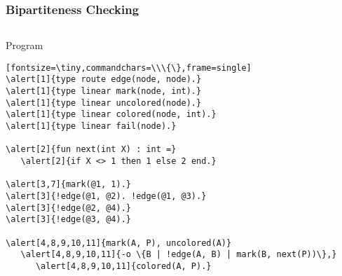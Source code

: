 \documentclass{beamer}
\let\oldalert\alert
\renewcommand{\alert}[2][]{%
  \if\relax\detokenize{#1}\relax%
    \oldalert{#2}%
  \else
    \oldalert<#1>{#2}%
  \fi}
\begin{document}
\begin{frame}[fragile]
  \frametitle{Bipartiteness Checking}
  \begin{columns}[t]
     \begin{block}{Program}
       \begin{verbatim}[fontsize=\tiny,commandchars=\\\{\},frame=single]
\alert[1]{type route edge(node, node).}
\alert[1]{type linear mark(node, int).}
\alert[1]{type linear uncolored(node).}
\alert[1]{type linear colored(node, int).}
\alert[1]{type linear fail(node).}

\alert[2]{fun next(int X) : int =}
   \alert[2]{if X <> 1 then 1 else 2 end.}

\alert[3,7]{mark(@1, 1).}
\alert[3]{!edge(@1, @2). !edge(@1, @3).}
\alert[3]{!edge(@2, @4).}
\alert[3]{!edge(@3, @4).}

\alert[4,8,9,10,11]{mark(A, P), uncolored(A)}
   \alert[4,8,9,10,11]{-o \{B | !edge(A, B) | mark(B, next(P))\},}
      \alert[4,8,9,10,11]{colored(A, P).}


\end{verbatim}
\end{block}
\end{columns}
\end{frame}
\end{document}
